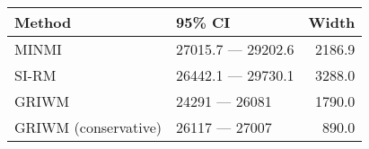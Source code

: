 
\begin{tabular}{llr}
\toprule
Method & 95\% CI & Width\\
\midrule
MINMI & 27015.7 --- 29202.6 & 2186.9\\
SI-RM & 26442.1 --- 29730.1 & 3288.0\\
GRIWM & 24291 --- 26081 & 1790.0\\
GRIWM (conservative) & 26117 --- 27007 & 890.0\\
\bottomrule
\end{tabular}
